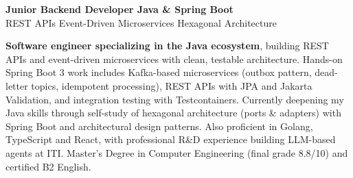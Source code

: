 \documentclass[11pt,a4paper,sans]{moderncv}
\begin{document}
\makecvtitle

\vspace{-4pt}
\begin{center}
{\Large\bfseries\color{color1}Junior Backend Developer \textbar{} Java \& Spring Boot}\\[3pt]
{\normalsize\color{color2}REST APIs \textbullet{} Event-Driven Microservices \textbullet{} Hexagonal Architecture}
\end{center}


\vspace{2pt}
\small{\textbf{Software engineer specializing in the Java ecosystem}, building REST APIs and event-driven microservices with clean, testable architecture. Hands-on Spring Boot 3 work includes Kafka-based microservices (outbox pattern, dead-letter topics, idempotent processing), REST APIs with JPA and Jakarta Validation, and integration testing with Testcontainers. Currently deepening my Java skills through self-study of hexagonal architecture (ports \& adapters) with Spring Boot and architectural design patterns. Also proficient in Golang, TypeScript and React, with professional R\&D experience building LLM-based agents at ITI. Master's Degree in Computer Engineering (final grade 8.8/10) and certified B2 English.}

\end{document}
